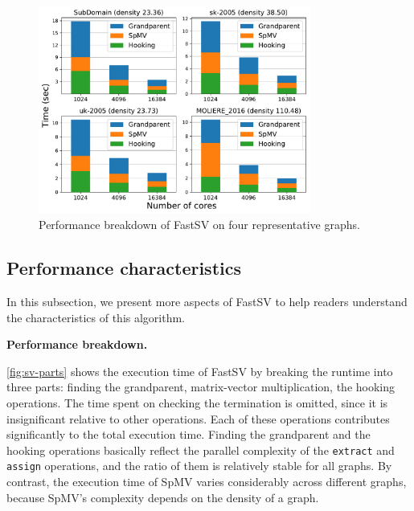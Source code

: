 \documentclass{sokendai_thesis} %
\newcommand{\Name}[0]{FastSV} %
\begin{document}
\begin{figure}[t]
\centering
\includegraphics[width=0.8\textwidth]{figures/breakdown_sv_selected.pdf}
\vspace{-5pt}
\caption{Performance breakdown of \Name{} on four representative graphs.}
\vspace{-8pt}
\label{fig:sv-parts}
\end{figure}

\subsection{Performance characteristics}
\label{sec:breakdown}

In this subsection, we present more aspects of \Name{} to help readers understand the characteristics of this algorithm.

\textbf{Performance breakdown.}

\autoref{fig:sv-parts} shows the execution time of \Name{} by breaking the runtime into three parts: finding the grandparent, matrix-vector multiplication, the hooking operations.
The time spent on checking the termination is omitted, since it is insignificant relative to other operations.
Each of these operations contributes significantly to the total execution time.
Finding the grandparent and the hooking operations basically reflect the parallel complexity of the \texttt{extract} and \texttt{assign} operations, and the ratio of them is relatively stable for all graphs.
By contrast, the execution time of SpMV varies considerably across different graphs, because SpMV's complexity depends on the density of a graph.
\end{document}
